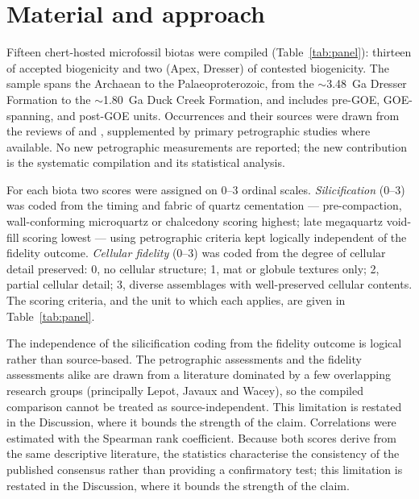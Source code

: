 \documentclass[11pt]{article}
\begin{document}
\section{Material and approach}

Fifteen chert-hosted microfossil biotas were compiled (Table~\ref{tab:panel}): thirteen of accepted
biogenicity and two (Apex, Dresser) of contested biogenicity. The sample spans the Archaean to the
Palaeoproterozoic, from the $\sim$3.48~Ga Dresser Formation to the $\sim$1.80~Ga Duck Creek
Formation, and includes pre-GOE, GOE-spanning, and post-GOE units. Occurrences and their sources
were drawn from the reviews of \citet{Javaux2018} and \citet{Wacey2014}, supplemented by primary
petrographic studies where available. No new petrographic measurements are reported; the new
contribution is the systematic compilation and its statistical analysis.

For each biota two scores were assigned on 0--3 ordinal scales. \emph{Silicification} (0--3) was
coded from the timing and fabric of quartz cementation --- pre-compaction, wall-conforming
microquartz or chalcedony scoring highest; late megaquartz void-fill scoring lowest --- using
petrographic criteria kept logically independent of the fidelity outcome. \emph{Cellular fidelity}
(0--3) was coded from the degree of cellular detail preserved: 0, no cellular structure; 1, mat or
globule textures only; 2, partial cellular detail; 3, diverse assemblages with well-preserved
cellular contents. The scoring criteria, and the unit to which each applies, are given in
Table~\ref{tab:panel}.

The independence of the silicification coding from the fidelity outcome is logical rather than
source-based. The petrographic assessments and the fidelity assessments alike are drawn from a
literature dominated by a few overlapping research groups (principally Lepot, Javaux and Wacey), so
the compiled comparison cannot be treated as source-independent. This limitation is restated in the
Discussion, where it bounds the strength of the claim. Correlations were estimated with the Spearman
rank coefficient. Because both scores derive from the same descriptive literature, the statistics
characterise the consistency of the published consensus rather than providing a confirmatory test;
this limitation is restated in the Discussion, where it bounds the strength of the claim.
\end{document}
